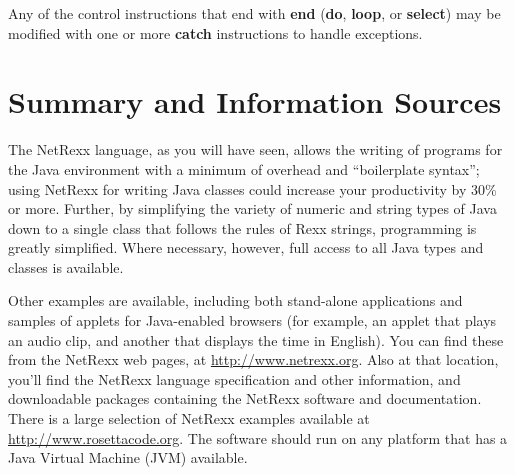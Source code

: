 Any of the control instructions that end with \textbf{end} (\textbf{do}, \textbf{loop}, or \textbf{select}) may be modified with one or more \textbf{catch} instructions to handle exceptions.

\section{Summary and Information Sources}
The NetRexx language, as you will have seen, allows the writing of programs for the Java environment with a minimum of overhead and “boilerplate syntax”; using NetRexx for writing Java classes could increase your productivity by 30\% or more.
Further, by simplifying the variety of numeric and string types of
Java down to a single class that follows the rules of Rexx strings,
programming is greatly simplified. Where necessary, however, full
access to all Java types and classes is available.

Other examples are available, including both stand-alone applications and samples of applets for Java-enabled browsers (for example, an applet that plays an audio clip, and another that displays the time in English). You can find these from the NetRexx web pages, at
    \url{http://www.netrexx.org}.
Also at that location, you’ll find the NetRexx language specification
and other information, and downloadable packages containing the
NetRexx software and documentation. There is a large selection of
NetRexx examples available at \url{http://www.rosettacode.org}.
The software should run on any platform that has a Java Virtual
Machine (JVM) available.
